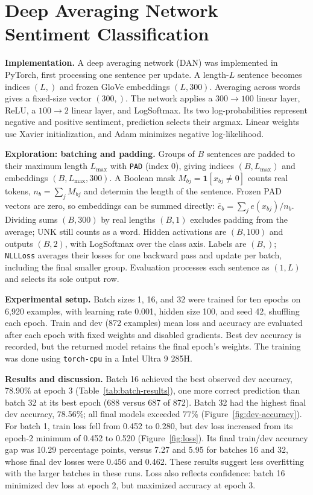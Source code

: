 \documentclass[11pt]{article}
\begin{document}
\section*{Deep Averaging Network Sentiment Classification}

\noindent\textbf{Implementation.}
A deep averaging network (DAN) was implemented in PyTorch, first processing
one sentence per update. A length-$L$ sentence becomes
indices $(L,)$ and frozen GloVe embeddings $(L,300)$. Averaging across words
gives a fixed-size vector $(300,)$.
The network applies a $300\!\to\!100$ linear layer, ReLU, a $100\!\to\!2$
linear layer, and LogSoftmax. Its two log-probabilities represent negative
and positive sentiment, prediction selects their argmax. Linear weights
use Xavier initialization, and Adam minimizes negative log-likelihood.

\smallskip
\noindent\textbf{Exploration: batching and padding.}
Groups of $B$ sentences are padded to their maximum length $L_{\max}$ with
\texttt{PAD} (index 0), giving indices $(B,L_{\max})$ and embeddings
$(B,L_{\max},300)$. A Boolean mask $M_{bj}=\mathbf{1}[x_{bj}\ne0]$ counts
real tokens, $n_b=\sum_j M_{bj}$ and determin the length of the sentence. Frozen PAD vectors are zero, so embeddings
can be summed directly: $\bar e_b=\sum_j e(x_{bj})/n_b$.
Dividing sums $(B,300)$ by real lengths $(B,1)$ excludes padding from the
average; UNK still counts as a word. Hidden activations are $(B,100)$ and
outputs $(B,2)$, with LogSoftmax over the class axis. Labels are $(B,)$;
\texttt{NLLLoss} averages their losses for one backward pass and update per
batch, including the final smaller group. Evaluation processes each
sentence as $(1,L)$ and selects its sole output row.

\smallskip
\noindent\textbf{Experimental setup.}
Batch sizes 1, 16, and 32 were trained for ten epochs on 6,920 examples,
with learning rate 0.001, hidden size 100, and seed 42, shuffling each epoch.
Train and dev (872 examples) mean loss and accuracy are evaluated after
each epoch with fixed weights and disabled gradients. Best dev accuracy is
recorded, but the returned model retains the final epoch's weights. The training was done using \texttt{torch-cpu} in a Intel Ultra 9 285H.



\noindent\textbf{Results and discussion.}
Batch 16 achieved the best observed dev accuracy, 78.90\% at epoch 3
(Table~\ref{tab:batch-results}), one more correct prediction than batch 32
at its best epoch (688 versus 687 of 872). Batch 32 had the highest final
dev accuracy, 78.56\%; all final models exceeded 77\% (Figure~\ref{fig:dev-accuracy}).
For batch 1, train loss fell from 0.452 to 0.280, but dev loss increased
from its epoch-2 minimum of 0.452 to 0.520 (Figure~\ref{fig:loss}).
Its final train/dev accuracy gap was 10.29 percentage points, versus 7.27
and 5.95 for batches 16 and 32, whose final dev losses were 0.456 and 0.462.
These results suggest less overfitting with the larger batches in these runs.
Loss also reflects confidence: batch 16 minimized dev loss at epoch 2,
but maximized accuracy at epoch 3.
\end{document}
